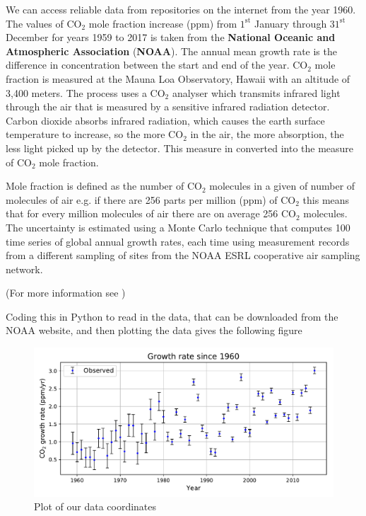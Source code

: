 \documentclass[12pt,twoside]{report}   %
\begin{document}
We can access reliable data from repositories on the internet from the year 1960. The values of $\mathrm{CO_2}$ mole fraction increase (ppm) from $1^{\text{st}}$ January through $31^{\text{st}}$ December for years 1959 to 2017 is taken from the \textbf{National Oceanic and Atmospheric Association} (\textbf{NOAA}). The annual mean growth rate is the difference in concentration between the start and end of the year. $\mathrm{CO_2}$ mole fraction is measured at the Mauna Loa Observatory, Hawaii with an altitude of 3,400 meters. The process uses a $\mathrm{CO_2}$ analyser which transmits infrared light through the air that is measured by a sensitive infrared radiation detector. Carbon dioxide absorbs infrared radiation, which causes the earth surface temperature to increase, so the more $\mathrm{CO_2}$ in the air, the more absorption, the less light picked up by the detector. This measure in converted into the measure of $\mathrm{CO_2}$ mole fraction.

Mole fraction is defined as the number of $\mathrm{CO_2}$ molecules in a given of number of molecules of air e.g. if there are 256 parts per million (ppm) of $\mathrm{CO_2}$ this means that for every million molecules of air there are on average 256 $\mathrm{CO_2}$ molecules. The uncertainty is estimated using a Monte Carlo technique that computes 100 time series of global annual growth rates, each time using measurement records from a different sampling of sites from the NOAA ESRL cooperative air sampling network.

(For more information see \cite{4})

Coding this in Python to read in the data, that can be downloaded from the NOAA website, and then plotting the data gives the following figure
\begin{figure}[H]
\centering
\includegraphics[width = 6in]{FullDataPlot.pdf}
\caption{Plot of our data coordinates}
\label{figFullDataPlot}
\end{figure}
\end{document}
